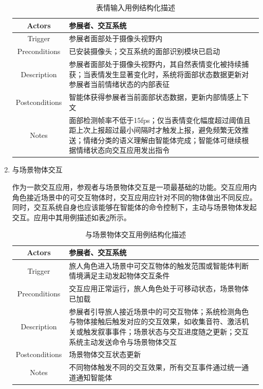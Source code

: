 \documentclass[bachelor]{njupthesis}
\begin{document}
\begin{enumerate}
\begin{table}[h]
\centering
\caption{表情输入用例结构化描述}
\begin{tabularx}{\linewidth}{cX}
\toprule
Actors & 参展者、交互系统 \\
\midrule
Trigger & 参展者面部处于摄像头视野内 \\
Preconditions & 已安装摄像头；交互系统的面部识别模块已启动 \\
Description & 参展者面部处于摄像头视野内，其自然表情变化被持续捕获；当表情发生显著变化时，系统将面部状态数据更新对参展者当前情绪状态的内部表征 \\
Postconditions & 智能体获得参展者当前面部状态数据，更新内部情感上下文 \\
Notes & 面部检测帧率不低于15fps；仅当表情变化幅度超过阈值且距上次上报超过最小间隔时才触发上报，避免频繁无效推送；情绪分类的语义理解由智能体完成；智能体可继续根据情绪状态向交互应用发出指令 \\
\bottomrule
\end{tabularx}
\label{tbl:usecase-expression}
\end{table}

\item 与场景物体交互

作为一款交互应用，参观者与场景物体交互是一项最基础的功能。交互应用内角色接近场景中的可交互物体时，交互应用应针对不同的物体做出不同反应。同时，交互系统自身也应该能够在智能体的命令控制下，主动与场景物体发起交互。应用中其用例描述如表\ref{tbl:usecase-interaction}所示。

\begin{table}[h]
\centering
\caption{与场景物体交互用例结构化描述}
\begin{tabularx}{\linewidth}{cX}
\toprule
Actors & 参展者、交互系统 \\
\midrule
Trigger & 旅人角色进入场景中可交互物体的触发范围或智能体判断情境满足主动发起物体交互条件 \\
Preconditions & 交互应用正常运行，旅人角色处于可移动状态，场景物体已加载 \\
Description & 参展者引导旅人接近场景中的可交互物体；系统检测角色与物体接触后触发对应的交互效果，如收集音符、激活机关或触发叙事事件；场景状态与交互进度随之更新；交互系统主动发送命令与场景物体交互 \\
Postconditions & 场景物体交互状态更新 \\
Notes & 不同物体触发不同的交互效果，所有交互事件通过统一通道通知智能体 \\
\bottomrule
\end{tabularx}
\label{tbl:usecase-interaction}
\end{table}


\end{enumerate}
\end{document}
